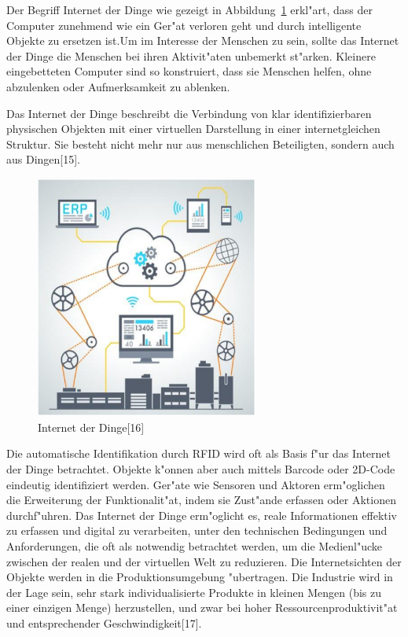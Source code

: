  Der Begriff Internet der Dinge wie gezeigt in Abbildung~\ref{fig:F} erkl"art,
  dass der Computer zunehmend wie
   ein Ger"at verloren geht und durch intelligente Objekte 
   zu ersetzen ist.Um im Interesse der Menschen zu sein, 
   sollte das Internet der Dinge die Menschen bei 
   ihren Aktivit"aten unbemerkt st"arken. 
   Kleinere eingebetteten Computer sind so konstruiert, 
   dass sie Menschen helfen, ohne abzulenken oder Aufmerksamkeit zu ablenken. 
   
  Das Internet der Dinge beschreibt die Verbindung von klar 
   identifizierbaren physischen Objekten mit einer virtuellen 
   Darstellung in einer internetgleichen Struktur. 
   Sie besteht nicht mehr nur aus menschlichen Beteiligten, 
   sondern auch aus Dingen[15].
 
 
 \begin{figure}[!htb]
\begin{center}
\includegraphics[height=8cm]{bilder/F.eps}
\end{center}
\caption{Internet der Dinge[16]}\label{fig:F}
\end{figure}

Die automatische Identifikation durch RFID wird oft als Basis 
f"ur das Internet der Dinge betrachtet. 
Objekte k"onnen aber auch mittels Barcode oder 
2D-Code eindeutig identifiziert werden. 
Ger"ate wie Sensoren und Aktoren erm"oglichen
 die Erweiterung der Funktionalit"at, 
 indem sie Zust"ande erfassen oder Aktionen durchf"uhren.
  Das Internet der Dinge erm"oglicht es, 
  reale Informationen effektiv zu erfassen und digital 
  zu verarbeiten, unter den technischen Bedingungen und Anforderungen, 
  die oft als notwendig betrachtet werden, 
  um die Medienl"ucke zwischen der realen und 
  der virtuellen Welt zu reduzieren. 
  Die Internetsichten der Objekte werden 
  in die Produktionsumgebung "ubertragen. 
  Die Industrie wird in der Lage sein, 
  sehr stark individualisierte Produkte in kleinen Mengen 
  (bis zu einer einzigen Menge) herzustellen, 
  und zwar bei hoher Ressourcenproduktivit"at 
  und entsprechender Geschwindigkeit[17].







 


